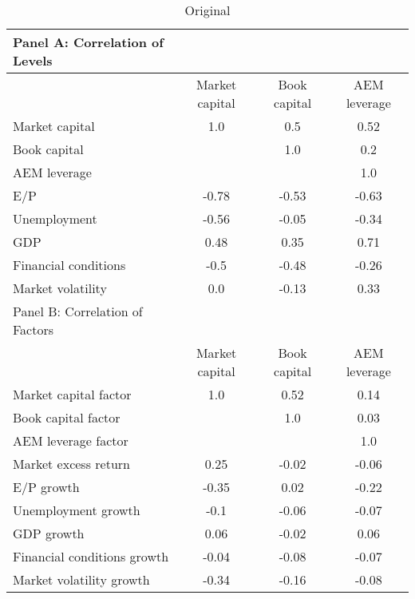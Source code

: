 
    \begin{table}[htbp]
    \centering
    \caption{\label{tab:correlation}Original}
    \begin{adjustbox}{max width=\textwidth}
    \small
    \begin{tabular}{lccc}
        \toprule
        Panel A: Correlation of Levels \\
        \midrule
         & Market capital & Book capital & AEM leverage \\
        \midrule
        Market capital & 1.0 & 0.5 & 0.52 \\
Book capital &  & 1.0 & 0.2 \\
AEM leverage &  &  & 1.0 \\
E/P & -0.78 & -0.53 & -0.63 \\
Unemployment & -0.56 & -0.05 & -0.34 \\
GDP & 0.48 & 0.35 & 0.71 \\
Financial conditions & -0.5 & -0.48 & -0.26 \\
Market volatility & 0.0 & -0.13 & 0.33 \\
        \midrule
        Panel B: Correlation of Factors \\
        \midrule
         & Market capital & Book capital & AEM leverage \\
        \midrule
        Market capital factor & 1.0 & 0.52 & 0.14 \\
Book capital factor &  & 1.0 & 0.03 \\
AEM leverage factor &  &  & 1.0 \\
Market excess return & 0.25 & -0.02 & -0.06 \\
E/P growth & -0.35 & 0.02 & -0.22 \\
Unemployment growth & -0.1 & -0.06 & -0.07 \\
GDP growth & 0.06 & -0.02 & 0.06 \\
Financial conditions growth & -0.04 & -0.08 & -0.07 \\
Market volatility growth & -0.34 & -0.16 & -0.08 \\
        \bottomrule
    \end{tabular}
    \end{adjustbox}
    \end{table}
    